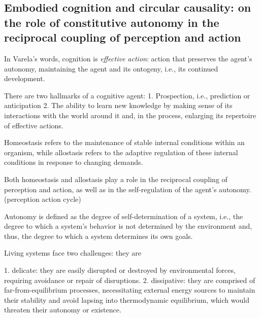
\subsection{Embodied cognition and circular causality: on the role of constitutive autonomy in the reciprocal coupling of perception and action}

\cite{vernon_embodied_2015}
In Varela's words, cognition is \textit{effective action}: action that preserves the agent's autonomy, maintaining the agent and its ontogeny, i.e., its continued development.

There are two hallmarks of a cognitive agent:
1. Prospection, i.e., prediction or anticipation
2. The ability to learn new knowledge by making sense of its interactions with the world around it and, in the process, enlarging its repertoire of effective actions.

Homeostasis refers to the maintenance of stable internal conditions within an organism, while allostasis refers to the adaptive regulation of these internal conditions in response to changing demands.

Both homeostasis and allostasis play a role in the reciprocal coupling of perception and action, as well as in the self-regulation of the agent's autonomy. (\gls{perception action cycle})

Autonomy is defined as the degree of self-determination of a system, i.e., the degree to which a system’s behavior is not determined by the environment and, thus, the degree to which a system determines its own goals. 


Living systems face two challenges: they are 

1. delicate: they are easily disrupted or destroyed by environmental forces, requiring avoidance or repair of disruptions.
2. dissipative: they are comprised of far-from-equilibrium processes, necessitating external energy sources to maintain their stability and avoid lapsing into thermodynamic equilibrium, which would threaten their autonomy or existence.

